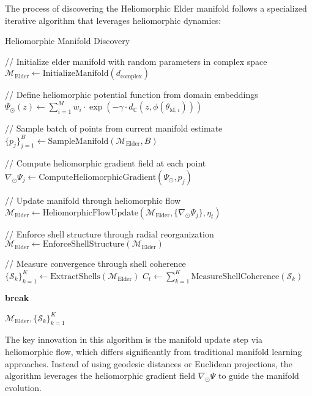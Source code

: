 The process of discovering the Heliomorphic Elder manifold follows a specialized iterative algorithm that leverages heliomorphic dynamics:

\begin{algorithm}
\caption{Heliomorphic Manifold Discovery}
\begin{algorithmic}[1]
    \State // Initialize elder manifold with random parameters in complex space
    \State $\mathcal{M}_{\text{Elder}} \gets \text{InitializeManifold}(d_{\text{complex}})$
    
    \State // Define heliomorphic potential function from domain embeddings
    \State $\Psi_{\odot}(z) \gets \sum_{i=1}^M w_i \cdot \exp(-\gamma \cdot d_{\mathbb{C}}(z, \phi(\theta_{\text{M},i})))$
    
        \State // Sample batch of points from current manifold estimate
        \State $\{p_j\}_{j=1}^B \gets \text{SampleManifold}(\mathcal{M}_{\text{Elder}}, B)$
        
        \State // Compute heliomorphic gradient field at each point
            \State $\nabla_{\odot} \Psi_j \gets \text{ComputeHeliomorphicGradient}(\Psi_{\odot}, p_j)$
        \EndFor
        
        \State // Update manifold through heliomorphic flow
        \State $\mathcal{M}_{\text{Elder}} \gets \text{HeliomorphicFlowUpdate}(\mathcal{M}_{\text{Elder}}, \{\nabla_{\odot} \Psi_j\}, \eta_t)$
        
        \State // Enforce shell structure through radial reorganization
        \State $\mathcal{M}_{\text{Elder}} \gets \text{EnforceShellStructure}(\mathcal{M}_{\text{Elder}})$
        
        \State // Measure convergence through shell coherence
        \State $\{\mathcal{S}_k\}_{k=1}^K \gets \text{ExtractShells}(\mathcal{M}_{\text{Elder}})$
        \State $C_t \gets \sum_{k=1}^K \text{MeasureShellCoherence}(\mathcal{S}_k)$
        
            \State \textbf{break}
        \EndIf
    \EndFor
    
    \State \Return $\mathcal{M}_{\text{Elder}}, \{\mathcal{S}_k\}_{k=1}^K$
\EndFunction
\end{algorithmic}
\end{algorithm}

The key innovation in this algorithm is the manifold update step via heliomorphic flow, which differs significantly from traditional manifold learning approaches. Instead of using geodesic distances or Euclidean projections, the algorithm leverages the heliomorphic gradient field $\nabla_{\odot} \Psi$ to guide the manifold evolution.

